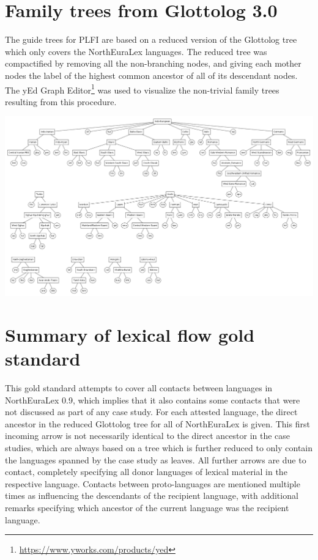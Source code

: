\section{Family trees from Glottolog 3.0}
The guide trees for PLFI are based on a reduced version of the Glottolog tree which only covers the NorthEuraLex languages. The reduced tree was compactified by removing all the non-branching nodes, and giving each mother nodes the label of the highest common ancestor of all of its descendant nodes. The yEd Graph Editor\footnote{\url{https://www.yworks.com/products/yed}} was used to visualize the non-trivial family trees resulting from this procedure.

\begin{center}
 \includegraphics[width=\textwidth]{figures/glottolog-family-trees.png}
 \addtocounter{table}{-1} 
\end{center}

\newpage

\section{Summary of lexical flow gold standard}
This gold standard attempts to cover all contacts between languages in NorthEuraLex 0.9, which implies that it also contains some contacts that were not discussed as part of any case study. For each attested language, the direct ancestor in the reduced Glottolog tree for all of NorthEuraLex is given. This first incoming arrow is not necessarily identical to the direct ancestor in the case studies, which are always based on a tree which is further reduced to only contain the languages spanned by the case study as leaves. All further arrows are due to contact, completely specifying all donor languages of lexical material in the respective language. Contacts between proto-languages are mentioned multiple times as influencing the descendants of the recipient language, with additional remarks specifying which ancestor of the current language was the recipient language.

